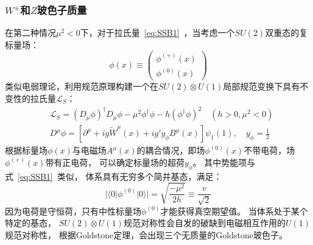 \subsubsection{$W^{\pm}$和$Z$玻色子质量}
\label{sec:SSBWZ}
在第二种情况$\mu^2<0$下，对于拉氏量~\ref{eq:SSB1}~，当考虑一个$SU(2)$双重态的复标量场：
\begin{equation} 
\label{eq:SSB7}
\phi(x) \equiv 
 \left( \begin{array}{l} \phi^{(+)}(x) \\  \phi^{(0)}(x) \end{array} \right)
\end{equation}
类似电弱理论，利用规范原理构建一个在$SU(2)\otimes U(1)$局部规范变换下具有不变性的拉氏量$\mathcal{L}_S$：
\begin{equation} 
\label{eq:SSB8}
\begin{split}
& \mathcal{L}_S= (D_{\mu}\phi)^{\dagger}D_{\mu}\phi- \mu^2 \phi^{\dagger} \phi - h \left(  \phi^{\dagger} \phi   \right)^2 \quad (h>0, \mu^2<0)
\\
&D^{\mu}\phi= \left[ \partial^{\mu}+ig\widetilde{W}^{\mu}(x)+ig'y_{\phi}B^{\mu}(x) \right] \psi_1(1), \quad y_{\phi}=\frac{1}{2}
\end{split}
\end{equation}
根据标量场$\phi(x)$与电磁场$A^{\mu}(x)$的耦合情况，即场$\phi^{(0)}(x)$不带电荷，场$\phi^{(+)}(x)$带有正电荷，
可以确定标量场的超荷$y_{\phi}$。
其中势能项与式~\ref{eq:SSB1}~类似，
体系具有无穷多个简并基态，满足：
\begin{equation} 
\label{eq:SSB10}
|\langle 0| \phi^{(0)} |0\rangle|=\sqrt{\frac{-\mu^2}{2h}}  \equiv \frac{v}{\sqrt{2}}
\end{equation}
因为电荷是守恒荷，只有中性标量场$\phi^{(0)}$才能获得真空期望值。
当体系处于某个特定的基态，
$SU(2)\otimes U(1)$规范对称性会自发的破缺到电磁相互作用的$U(1)$规范对称性，
根据Goldstone定理，会出现三个无质量的Goldstone玻色子。

